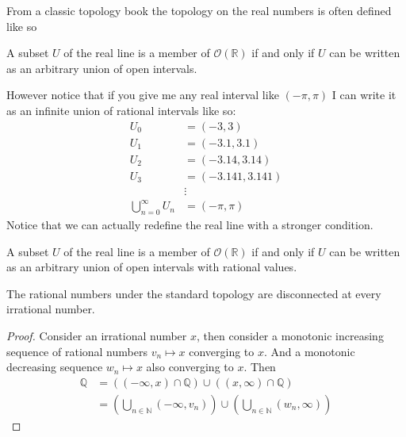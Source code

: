 From a classic topology book the topology on the real numbers is often defined like so
\begin{lie}
    A subset $U$ of the real line is a member of $\mathcal{O}(\mathbb{R})$ if and only if $U$ can be written as an arbitrary union of open intervals.
\end{lie}
However notice that if you give me any real interval like $(-\pi,\pi)$ I can write it as an infinite union of rational intervals like so:
\begin{align*}
    U_0 &= (-3,3)\\
    U_1 &= (-3.1,3.1)\\
    U_2 &= (-3.14,3.14)\\
    U_3 &= (-3.141,3.141)\\
    & \vdots\\
    \bigcup_{n=0}^\infty U_n &= (-\pi,\pi)
\end{align*}
Notice that we can actually redefine the real line with a stronger condition.
\begin{lie}
    A subset $U$ of the real line is a member of $\mathcal{O}(\mathbb{R})$ if and only if $U$ can be written as an arbitrary union of open intervals with rational values.
\end{lie}

\begin{theorem}
    The rational numbers under the standard topology are disconnected at every irrational number.
\end{theorem}
\begin{proof}
    Consider an irrational number $x$, then consider a monotonic increasing sequence of rational numbers $v_n \mapsto x$ converging to $x$. And a monotonic decreasing sequence $w_n \mapsto x$ also converging to $x$. Then
    \begin{align*}
        \mathbb{Q} &= ((-\infty,x)\cap \mathbb{Q}) \cup ((x,\infty)\cap \mathbb{Q})\\
        &=\left(\bigcup_{n\in \mathbb{N}} (-\infty,v_n) \right) \cup \left(\bigcup_{n\in \mathbb{N}} (w_n, \infty) \right)
    \end{align*}
\end{proof}

